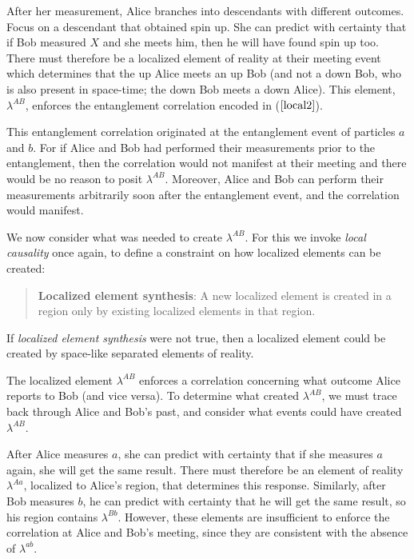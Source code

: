 \documentclass[a4paper]{article}
\begin{document}
After her measurement, Alice branches into descendants with different outcomes. Focus on a descendant that obtained spin up. She can predict with certainty that if Bob measured $X$ and she meets him, then he will have found spin up too. There must therefore be a localized element of reality at their meeting event which determines that the up Alice meets an up Bob (and not a down Bob, who is also present in space-time; the down Bob meets a down Alice). This element, $\lambda^{AB}$, enforces the entanglement correlation encoded in ($\ref{local2}$). 

This entanglement correlation originated at the entanglement event of particles $a$ and $b$. For if Alice and Bob had performed their measurements prior to the entanglement, then the correlation would not manifest at their meeting and there would be no reason to posit $\lambda^{AB}$. Moreover, Alice and Bob can perform their measurements arbitrarily soon after the entanglement event, and the correlation would manifest. 

We now consider what was needed to create $\lambda^{AB}$. For this we invoke \textit{local causality} once again, to define a constraint on how localized elements can be created:

\begin{quote} 
\textbf{Localized element synthesis}: A new localized element is created in a region only by existing localized elements in that region.
\end{quote}

If \textit{localized element synthesis} were not true, then a localized element could be created by space-like separated elements of reality. 

The localized element $\lambda^{AB}$ enforces a correlation concerning what outcome Alice reports to Bob (and vice versa). To determine what created $\lambda^{AB}$, we must trace back through Alice and Bob's past, and consider what events could have created $\lambda^{AB}$. 

After Alice measures $a$, she can predict with certainty that if she measures $a$ again, she will get the same result. There must therefore be an element of reality $\lambda^{Aa}$, localized to Alice's region, that determines this response. Similarly, after Bob measures $b$, he can predict with certainty that he will get the same result, so his region contains $\lambda^{Bb}$. However, these elements are insufficient to enforce the correlation at Alice and Bob's meeting, since they are consistent with the absence of $\lambda^{ab}$.
\end{document}
